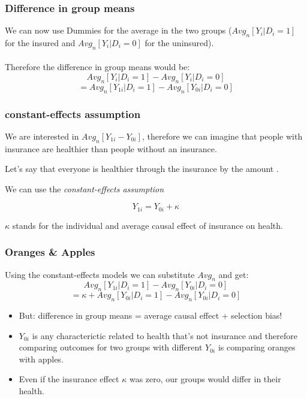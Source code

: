 \documentclass{beamer}
\begin{document}
\begin{frame}
\frametitle{Difference in group means}
We can now use Dummies for the average in the two groups ($Avg_n[Y_i|D_i=1]$ for the insured and $Avg_n[Y_i|D_i=0]$ for the uninsured).\\~\\

Therefore the difference in group means would be:
$$Avg_n[Y_i|D_i=1]-Avg_n[Y_i|D_i=0]$$
$$=Avg_n[Y_{1i}|D_i=1]-Avg_n[Y_{0i}|D_i=0]$$

\end{frame}

\begin{frame}
\frametitle{constant-effects assumption}
We are interested in $Avg_n[Y_{1i}-Y_{0i}]$, therefore we can imagine that people with insurance are healthier than people without an insurance.

Let's say that everyone is healthier through the insurance by the amount \kappa.

We can use the \textit{constant-effects assumption}

$$Y_{1i} = Y_{0i} + \kappa$$

$\kappa$ stands for the individual and average causal effect of insurance on health.

\end{frame}
\begin{frame}
\frametitle{Oranges \& Apples}

Using the constant-effects models we can substitute $Avg_n$ and get:
$$Avg_n[Y_{1i}|D_i=1]-Avg_n[Y_{0i}|D_i=0]$$
$$= {\kappa +Avg_n[Y_{0i}|D_i=1]} - Avg_n[Y_{0i}|D_i=0]$$

\begin{itemize}

	\item But: difference in group means = average causal effect + selection bias!

	\item $Y_{0i}$ is any characterictic related to health that's not insurance and therefore comparing outcomes for two groups with different $Y_{0i}$ is comparing oranges with apples.

	\item Even if the insurance effect $\kappa$ was zero, our groups would differ in their health.
\end{itemize}

\end{frame}
\end{document}
